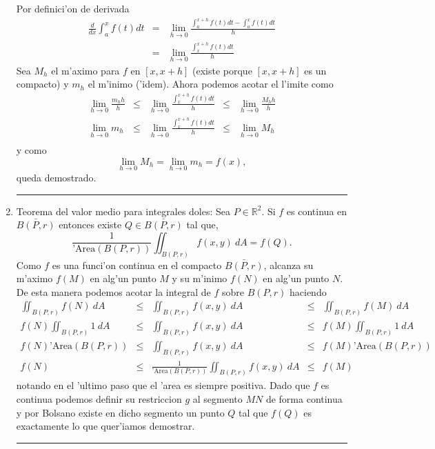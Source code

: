 \documentclass[a4paper,spanish]{article}
\newcommand{\R}[0]{\mathbb{R}}
\newcommand{\limite}[2]{\lim_{ #1 \rightarrow #2}}
\newenvironment{demo}{{\noindent \textbf{Demo: }}}{\hfill\rule{2mm}{2mm}\par}
\begin{document}
\begin{enumerate}
\begin{demo}
Por definici'on de derivada
\begin{eqnarray*}
\frac{d}{dx} \int_a^x f(t) dt &=& 
	\limite{h}{0} \frac{\int_a^{x+h} f(t) dt - \int_a^x f(t) dt}{h} \\
&=& \limite{h}{0} \frac{\int_x^{x+h} f(t) dt}{h}
\end{eqnarray*}
Sea $M_h$ el m'aximo para $f$ en $[x,x+h]$ (existe porque $[x,x+h]$ es un
compacto) y $m_h$ el m'inimo ('idem). Ahora podemos acotar el l'imite como
$$
\begin{array}{rcccl}
\displaystyle \limite{h}{0} \frac{m_h h}{h} &\leq&
\displaystyle \limite{h}{0} \frac{\int_x^{x+h} f(t) dt}{h} &\leq&
\displaystyle \limite{h}{0} \frac{M_h h}{h} \\
\displaystyle \limite{h}{0} m_h &\leq&
\displaystyle \limite{h}{0} \frac{\int_x^{x+h} f(t) dt}{h} &\leq&
\displaystyle \limite{h}{0} M_h \\
\end{array}
$$
y como
$$\limite{h}{0} M_h = \limite{h}{0} m_h = f(x),$$
queda demostrado.
\end{demo}

\item Teorema del valor medio para integrales doles: Sea $P \in \R^2$. Si $f$
es continua en $\bar{B(P,r)}$ entonces existe $Q \in \bar{B(P,r)}$ tal que,
$$\frac{1}{\mbox{'Area}(B(P,r))} \iint_{B(P,r)} f(x,y)\ dA = f(Q).$$
\begin{demo}
Como $f$ es una funci'on continua en el compacto $\bar{B(P,r)}$, alcanza su
m'aximo $f(M)$ en alg'un punto $M$ y su m'inimo $f(N)$ en alg'un punto $N$.
De esta manera podemos acotar la integral de $f$ sobre $B(P,r)$ haciendo
$$
\begin{array}{rcccl}
\displaystyle \iint_{B(P,r)} f(N)\ dA &\leq& 
	\displaystyle \iint_{B(P,r)} f(x,y)\ dA &\leq&
 		\displaystyle \iint_{B(P,r)} f(M)\ dA \\[0.2cm]
\displaystyle f(N) \iint_{B(P,r)} 1\ dA &\leq&
	\displaystyle \iint_{B(P,r)} f(x,y)\ dA &\leq&
		\displaystyle f(M) \iint_{B(P,r)} 1\ dA \\[0.2cm]
\displaystyle f(N) \mbox{'Area}(B(P,r)) &\leq&
	\displaystyle \iint_{B(P,r)} f(x,y)\ dA &\leq&
		\displaystyle f(M) \mbox{'Area}(B(P,r)) \\[0.2cm]
\displaystyle f(N) &\leq& \displaystyle
	\frac{1}{\mbox{'Area}(B(P,r))} \iint_{B(P,r)} f(x,y)\ dA &\leq&
		\displaystyle f(M)
\end{array}
$$
notando en el 'ultimo paso que el 'area es siempre positiva. Dado que $f$ es
continua podemos definir su restriccion $g$ al segmento $MN$ de forma continua
y por Bolsano existe en dicho segmento un punto $Q$ tal que $f(Q)$ es
exactamente lo que quer'iamos demostrar.
\end{demo}

\end{enumerate}

\label{theend}
\end{document}
